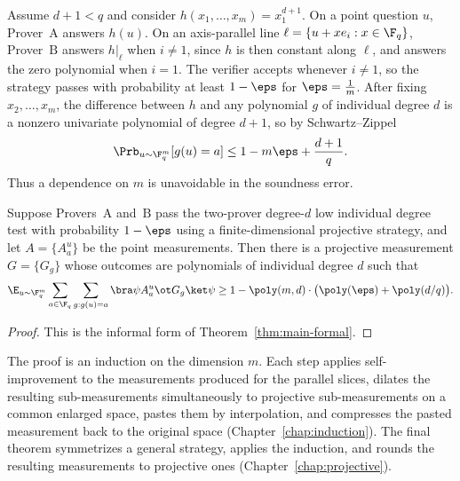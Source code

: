 \begin{remark}\label{ex:bad-individual-degree-example}
	Assume $d+1<q$ and consider $h(x_1,\ldots,x_m)=x_1^{d+1}$.  On a point
	question $u$, Prover~$\mathrm{A}$ answers $h(u)$.  On an axis-parallel line
	$\ell=\{u+xe_i:x\in\F_q\}$, Prover~$\mathrm{B}$ answers $h|_\ell$ when
	$i\ne1$, since $h$ is then constant along $\ell$, and answers the zero
	polynomial when $i=1$.  The verifier accepts whenever $i\ne1$, so the
	strategy passes with probability at least $1-\eps$ for $\eps=\frac1m$.
	After fixing $x_2,\ldots,x_m$, the difference between $h$ and any
	polynomial $g$ of individual degree $d$ is a nonzero univariate polynomial
	of degree $d+1$, so by Schwartz--Zippel
	\[
		\Prb_{u\sim\F_q^m}[g(u)=a]\le1-m\eps+\frac{d+1}q.
	\]
	Thus a dependence on $m$ is unavoidable in the soundness error.
\end{remark}

\begin{theorem}\label{thm:main-informal}
	Suppose Provers~$\mathrm{A}$ and~$\mathrm{B}$ pass the two-prover degree-$d$
	low individual degree test with probability $1-\eps$ using a
	finite-dimensional projective strategy, and let $A=\{A^u_a\}$ be the point
	measurements.  Then there is a projective measurement $G=\{G_g\}$ whose
	outcomes are polynomials of individual degree $d$ such that
	\[
		\E_{u\sim\F_q^m}\sum_{a\in\F_q}\sum_{g:g(u)=a}
		\bra\psi A^u_a\ot G_g\ket\psi
		\ge1-\poly(m,d)\cdot\bigl(\poly(\eps)+\poly(d/q)\bigr).
	\]
\end{theorem}
\begin{proof}
	This is the informal form of Theorem~\ref{thm:main-formal}.
\end{proof}

The proof is an induction on the dimension $m$.  Each step applies
self-improvement to the measurements produced for the parallel slices,
dilates the resulting sub-measurements simultaneously to projective
sub-measurements on a common enlarged space, pastes them by interpolation,
and compresses the pasted measurement back to the original space
(Chapter~\ref{chap:induction}).  The final theorem symmetrizes a general
strategy, applies the induction, and rounds the resulting measurements to
projective ones (Chapter~\ref{chap:projective}).
